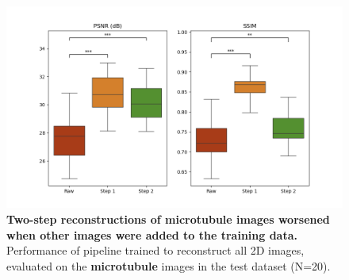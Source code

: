 \documentclass[12pt]{article}
\begin{document}
\begin{figure}[hbt]
    \includegraphics[scale=0.72, center]{figures/boxplot_2d_1.png}
    \caption{\textbf{Two-step reconstructions of microtubule images worsened when other images were added to the training data.}
    Performance of pipeline trained to reconstruct all 2D images, evaluated on the \textbf{microtubule} images in the test dataset (N=20).}
    \label{fig:m023_m024_561_pipeline_stats}
\end{figure}
\end{document}
